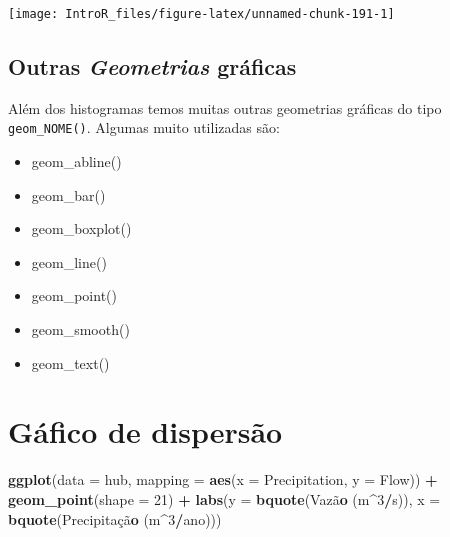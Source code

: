 \documentclass[
]{book}
\newenvironment{Shaded}{\begin{snugshade}}{\end{snugshade}}
\newcommand{\DataTypeTok}[1]{\textcolor[rgb]{0.13,0.29,0.53}{#1}}
\newcommand{\DecValTok}[1]{\textcolor[rgb]{0.00,0.00,0.81}{#1}}
\newcommand{\KeywordTok}[1]{\textcolor[rgb]{0.13,0.29,0.53}{\textbf{#1}}}
\newcommand{\NormalTok}[1]{#1}
\newcommand{\OperatorTok}[1]{\textcolor[rgb]{0.81,0.36,0.00}{\textbf{#1}}}
\newcommand{\StringTok}[1]{\textcolor[rgb]{0.31,0.60,0.02}{#1}}
\providecommand{\tightlist}{%
  \setlength{\itemsep}{0pt}\setlength{\parskip}{0pt}}
\begin{document}
\begin{center}\texttt{[image: IntroR\_files/figure-latex/unnamed-chunk-191-1]} \end{center}

\hypertarget{outras-geometrias-gruxe1ficas}{%
\subsection{\texorpdfstring{Outras \emph{Geometrias} gráficas}{Outras Geometrias gráficas}}\label{outras-geometrias-gruxe1ficas}}

Além dos histogramas temos muitas outras geometrias gráficas do tipo \texttt{geom\_NOME()}. Algumas muito utilizadas são:

\begin{itemize}
\tightlist
\item
  geom\_abline()
\item
  geom\_bar()
\item
  geom\_boxplot()
\item
  geom\_line()
\item
  geom\_point()
\item
  geom\_smooth()
\item
  geom\_text()
\end{itemize}

\hypertarget{guxe1fico-de-dispersuxe3o}{%
\section{Gáfico de dispersão}\label{guxe1fico-de-dispersuxe3o}}

\begin{Shaded}
\begin{Highlighting}[]
\KeywordTok{ggplot}\NormalTok{(}\DataTypeTok{data =}\NormalTok{ hub, }\DataTypeTok{mapping =} \KeywordTok{aes}\NormalTok{(}\DataTypeTok{x =}\NormalTok{ Precipitation, }\DataTypeTok{y =}\NormalTok{ Flow)) }\OperatorTok{+}
\StringTok{  }\KeywordTok{geom_point}\NormalTok{(}\DataTypeTok{shape =} \DecValTok{21}\NormalTok{) }\OperatorTok{+}
\StringTok{  }\KeywordTok{labs}\NormalTok{(}\DataTypeTok{y =} \KeywordTok{bquote}\NormalTok{(Vazã}\KeywordTok{o}\NormalTok{ (m}\OperatorTok{^}\DecValTok{3}\OperatorTok{/}\NormalTok{s)),}
       \DataTypeTok{x =} \KeywordTok{bquote}\NormalTok{(Precipitaçã}\KeywordTok{o}\NormalTok{ (m}\OperatorTok{^}\DecValTok{3}\OperatorTok{/}\NormalTok{ano)))}
\end{Highlighting}
\end{Shaded}
\end{document}
